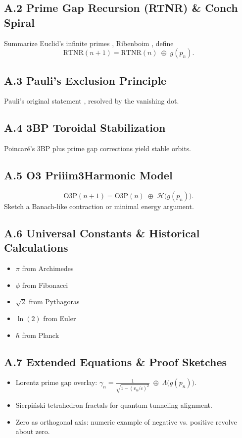 \documentclass[11pt]{article}
\begin{document}
\subsection{A.2 Prime Gap Recursion (RTNR) \& Conch Spiral}
Summarize Euclid’s infinite primes \cite{Euclid300BC}, Ribenboim \cite{Ribenboim1996}, define
$$
\mathrm{RTNR}(n+1) = \mathrm{RTNR}(n) \;\oplus\; g(p_n).
$$

\subsection{A.3 Pauli’s Exclusion Principle}
Pauli’s original statement \cite{Pauli1925}, resolved by the vanishing dot.

\subsection{A.4 3BP Toroidal Stabilization}
Poincaré’s 3BP \cite{Poincare1892} plus prime gap corrections yield stable orbits.

\subsection{A.5 O3 Priiim3Harmonic Model}
$$
\mathrm{O3P}(n+1) 
= \mathrm{O3P}(n) 
\;\oplus\; 
\mathcal{H}\bigl(g(p_n)\bigr).
\tag{A.5}
$$
Sketch a Banach-like contraction or minimal energy argument.

\subsection{A.6 Universal Constants \& Historical Calculations}
\begin{itemize}
    \item $\pi$ from Archimedes \cite{Archimedes287BC}  
    \item $\phi$ from Fibonacci \cite{Fibonacci1202}  
    \item $\sqrt{2}$ from Pythagoras \cite{Pythagoras500BC}  
    \item $\ln(2)$ from Euler \cite{Euler1736}  
    \item $\hbar$ from Planck \cite{Planck1900}
\end{itemize}

\subsection{A.7 Extended Equations \& Proof Sketches}
\begin{itemize}
    \item Lorentz prime gap overlay: $\gamma_n = \frac{1}{\sqrt{1-(v_n/c)^2}} \;\oplus\; \Lambda\bigl(g(p_n)\bigr).$
    \item Sierpi\'nski tetrahedron fractals for quantum tunneling alignment.
    \item Zero as orthogonal axis: numeric example of negative vs. positive revolve about zero.
\end{itemize}
\end{document}
